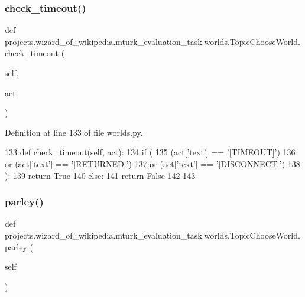 \subsubsection{\texorpdfstring{check\+\_\+timeout()}{check\_timeout()}}
{\footnotesize\ttfamily def projects.\+wizard\+\_\+of\+\_\+wikipedia.\+mturk\+\_\+evaluation\+\_\+task.\+worlds.\+Topic\+Choose\+World.\+check\+\_\+timeout (\begin{DoxyParamCaption}\item[{}]{self,  }\item[{}]{act }\end{DoxyParamCaption})}



Definition at line 133 of file worlds.\+py.


\begin{DoxyCode}
133     \textcolor{keyword}{def }check\_timeout(self, act):
134         \textcolor{keywordflow}{if} (
135             (act[\textcolor{stringliteral}{'text'}] == \textcolor{stringliteral}{'[TIMEOUT]'})
136             \textcolor{keywordflow}{or} (act[\textcolor{stringliteral}{'text'}] == \textcolor{stringliteral}{'[RETURNED]'})
137             \textcolor{keywordflow}{or} (act[\textcolor{stringliteral}{'text'}] == \textcolor{stringliteral}{'[DISCONNECT]'})
138         ):
139             \textcolor{keywordflow}{return} \textcolor{keyword}{True}
140         \textcolor{keywordflow}{else}:
141             \textcolor{keywordflow}{return} \textcolor{keyword}{False}
142 
143 
\end{DoxyCode}
\mbox{\label{classprojects_1_1wizard__of__wikipedia_1_1mturk__evaluation__task_1_1worlds_1_1TopicChooseWorld_a1ede8a9a810cffefa36645ae3a3929bc}} 
\subsubsection{\texorpdfstring{parley()}{parley()}}
{\footnotesize\ttfamily def projects.\+wizard\+\_\+of\+\_\+wikipedia.\+mturk\+\_\+evaluation\+\_\+task.\+worlds.\+Topic\+Choose\+World.\+parley (\begin{DoxyParamCaption}\item[{}]{self }\end{DoxyParamCaption})}



